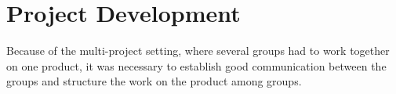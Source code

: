 \chapter{Project Development}
Because of the multi-project setting, where several groups had to work together on one product, it was necessary to establish good communication between the groups and structure the work on the product among groups. 